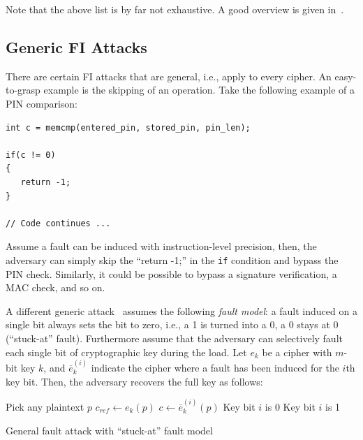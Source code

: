 Note that the above list is by far not exhaustive. A good overview is given in~\cite{Hamid04thesorcerers}.

\subsection{Generic \acs{FI} Attacks}
There are certain \ac{FI} attacks that are general, i.e., apply to every cipher. An easy-to-grasp example is the skipping of an operation. Take the following example of a PIN comparison:

\lstset{language=C}
\begin{lstlisting}
int c = memcmp(entered_pin, stored_pin, pin_len);

if(c != 0)
{
   return -1;
}

// Code continues ...
\end{lstlisting}

Assume a fault can be induced with instruction-level precision, then, the adversary can simply skip the ``return -1;'' in the \verb+if+ condition and bypass the PIN check. Similarly, it could be possible to bypass a signature verification, a \ac{MAC} check, and so on.

A different generic attack~\cite{BihamShamir97} assumes the following \emph{fault model}: a fault induced on a single bit always sets the bit to zero, i.e., a 1 is turned into a 0, a 0 stays at 0 (``stuck-at'' fault). Furthermore assume that the adversary can selectively fault each single bit of cryptographic key during the load. 
Let $e_k$ be a cipher with $m$-bit key $k$, and $\overline{e}_k^{(i)}$ indicate the cipher where a fault has been induced for the $i$th key bit.
Then, the adversary recovers the full key as follows:

\begin{algorithm}
\center
\begin{algorithmic}
\vspace{2mm}

\State Pick any plaintext $p$
\State $c_{ref} \gets e_k\left(p\right)$
\vspace{2mm}
\vspace{1mm}
	\State $c \gets \overline{e}_k^{(i)}\left(p\right)$
		\State Key bit $i$ is 0
	\Else
	  \State Key bit $i$ is 1
	\EndIf
	\vspace{1mm} 
\EndFor
\vspace{2mm}
\end{algorithmic}
\caption{General fault attack with ``stuck-at'' fault model}
\label{alg:impl_attacks:gen_fi}
\end{algorithm}

